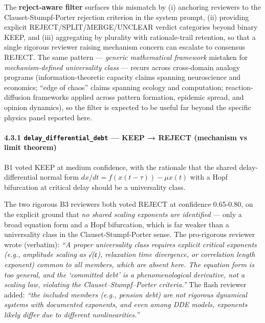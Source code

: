 \documentclass[
  letterpaper,
  11pt]{article}
\begin{document}
The \textbf{reject-aware filter} surfaces this mismatch by (i) anchoring
reviewers to the Clauset-Stumpf-Porter rejection criterion in the system
prompt, (ii) providing explicit REJECT/SPLIT/MERGE/UNCLEAR verdict
categories beyond binary KEEP, and (iii) aggregating by plurality with
rationale-trail retention, so that a single rigorous reviewer raising
mechanism concern can escalate to consensus REJECT. The same pattern ---
\emph{generic mathematical framework} mistaken for
\emph{mechanism-defined universality class} --- recurs across
cross-domain analogy programs (information-theoretic capacity claims
spanning neuroscience and economics; ``edge of chaos'' claims spanning
ecology and computation; reaction-diffusion frameworks applied across
pattern formation, epidemic spread, and opinion dynamics), so the filter
is expected to be useful far beyond the specific physics panel reported
here.

\paragraph{\texorpdfstring{4.3.1 \texttt{delay\_differential\_debt} ---
KEEP → REJECT (mechanism vs limit
theorem)}{4.3.1 delay\_differential\_debt --- KEEP → REJECT (mechanism vs limit theorem)}}\label{delay_differential_debt-keep-reject-mechanism-vs-limit-theorem}

B1 voted KEEP at medium confidence, with the rationale that the shared
delay-differential normal form \(dx/dt = f(x(t-\tau)) - \mu x(t)\) with
a Hopf bifurcation at critical delay should be a universality class.

The two rigorous B3 reviewers both voted REJECT at confidence 0.65-0.80,
on the explicit ground that \emph{no shared scaling exponents are
identified} --- only a broad equation form and a Hopf bifurcation, which
is far weaker than a universality class in the Clauset-Stumpf-Porter
sense. The pro-rigorous reviewer wrote (verbatim): \emph{``A proper
universality class requires explicit critical exponents (e.g., amplitude
scaling as √(ε), relaxation time divergence, or correlation length
exponent) common to all members, which are absent here. The equation
form is too general, and the `committed debt' is a phenomenological
derivative, not a scaling law, violating the Clauset--Stumpf--Porter
criteria.''} The flash reviewer added: \emph{``the included members
(e.g., pension debt) are not rigorous dynamical systems with documented
exponents, and even among DDE models, exponents likely differ due to
different nonlinearities.''}
\end{document}

